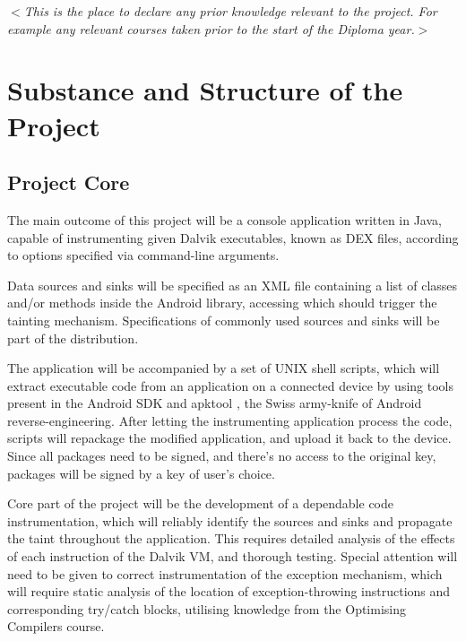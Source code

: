 \documentclass[12pt]{article}
\newcommand{\al}{$<$}
\newcommand{\ar}{$>$}
\begin{document}
\al\emph{This is the place to declare any prior knowledge relevant to
  the project.  For example any relevant courses taken prior to the
  start of the Diploma year.}\ar


\section*{Substance and Structure of the Project}

\subsection*{Project Core}

The main outcome of this project will be a console application written 
in Java, capable of instrumenting given Dalvik executables, known as DEX
files, according to options specified via command-line arguments. 

Data sources and sinks will be specified as an XML file containing a list
of classes and/or methods inside the Android library, accessing which
should trigger the tainting mechanism. Specifications of commonly used 
sources and sinks will be part of the distribution.

The application will be accompanied by a set of UNIX shell scripts, which 
will extract executable code from an application on a connected device 
by using tools present in the Android SDK and apktool 
\cite{code.google.com/p/android-apktool}, the Swiss army-knife of
Android reverse-engineering. After letting the instrumenting application
process the code, scripts will repackage the modified application, and 
upload it back to the device. Since all packages need to be signed, and
there's no access to the original key, packages will be signed by a 
key of user's choice.

Core part of the project will be the development of a dependable code 
instrumentation, which will reliably identify the sources and sinks and
propagate the taint throughout the application. This requires detailed
analysis of the effects of each instruction of the Dalvik VM, and 
thorough testing. Special attention will need to be given to correct 
instrumentation of the exception mechanism, which will require static 
analysis of the location of exception-throwing instructions and 
corresponding try/catch blocks, utilising knowledge from the Optimising
Compilers course.
\end{document}
